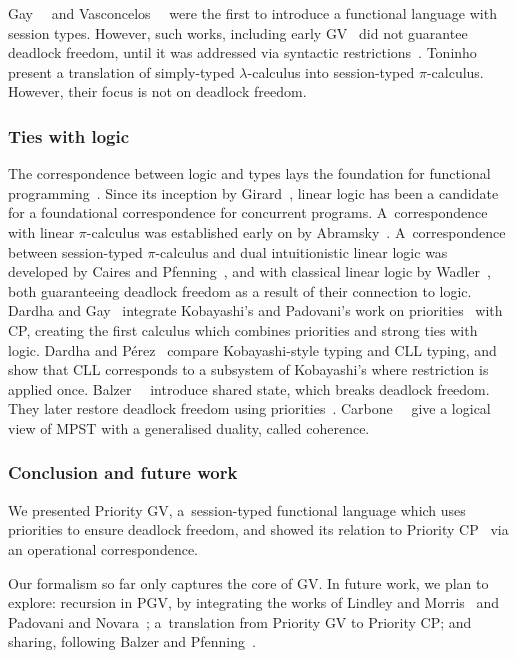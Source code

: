 \documentclass[main.tex]{subfiles}
\begin{document}
Gay~\etal~\cite{gaynagarajan03} and Vasconcelos~\etal~\cite{vasconcelosravara04,vasconcelosgay06} were the first to introduce a functional language with session types. However, such works, including early GV~\cite{gayvasconcelos10,gayvasconcelos12} did not guarantee deadlock freedom, until it was addressed via syntactic restrictions~\cite{lindleymorris15,wadler14}. Toninho~\etal~\cite{toninhocaires12} present a translation of simply-typed $\lambda$-calculus into session-typed $\pi$-calculus. However, their focus is not on deadlock freedom.

\subsubsection*{Ties with logic}
The correspondence between logic and types lays the foundation for functional programming~\cite{wadler15}. Since its inception by Girard~\cite{girard87}, linear logic has been a candidate for a foundational correspondence for concurrent programs. A~correspondence with linear $\pi$-calculus was established early on by Abramsky~\cite{abramsky94,bellinscott94}. A~correspondence between session-typed $\pi$-calculus and dual intuitionistic linear logic was developed by Caires and Pfenning~\cite[$\pi\text{DILL}$]{cairespfenning10}, and with classical linear logic by Wadler~\cite[CP]{wadler15}, both guaranteeing deadlock freedom as a result of their connection to logic. Dardha and Gay~\cite[PCP]{dardhagay18} integrate Kobayashi's and Padovani's work on priorities~\cite{kobayashi06,padovani14} with CP, creating the first calculus which combines priorities and strong ties with logic. Dardha and P\'{e}rez~\cite{dardhaperez15} compare Kobayashi-style typing and CLL typing, and show that CLL corresponds to a subsystem of Kobayashi's where restriction is applied once. Balzer~\etal~\cite[$\text{SILL}_S$]{balzerpfenning17} introduce shared state, which breaks deadlock freedom. They later restore deadlock freedom using priorities~\cite[$\text{SILL}_{S+}$]{balzertoninho19}.
Carbone~\etal~\cite{carbonelindley16} give a logical view of MPST with a generalised duality, called coherence.

\subsubsection*{Conclusion and future work}
We presented Priority GV, a~session-typed functional language which uses priorities to ensure deadlock freedom, and showed its relation to Priority CP~\cite{dardhagay18} via an operational correspondence.

Our formalism so far only captures the core of GV. In future work, we plan to explore: recursion in PGV, by integrating the works of Lindley and Morris~\cite{lindleymorris16} and Padovani and Novara~\cite{padovaninovara15}; a~translation from Priority GV to Priority CP; and sharing, following Balzer and Pfenning~\cite{balzerpfenning17}.
\end{document}

